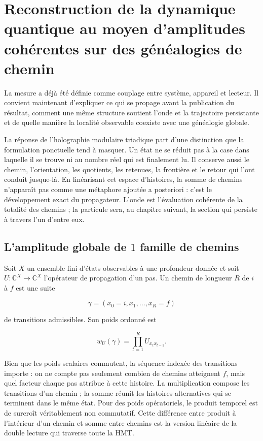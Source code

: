 \chapter{Reconstruction de la dynamique quantique au moyen d'amplitudes cohérentes sur des généalogies de chemin}


La mesure a déjà été définie comme couplage entre système, appareil et lecteur.
Il convient maintenant d'expliquer ce qui se propage avant la publication du résultat,
comment une même structure soutient l'onde et la trajectoire persistante et de quelle manière la
localité observable coexiste avec une généalogie globale.

La réponse de l'holographie modulaire triadique part d'une distinction que la
formulation ponctuelle tend à masquer. Un état ne se réduit pas à la case dans
laquelle il se trouve ni au nombre réel qui est finalement lu. Il conserve aussi
le chemin, l'orientation, les quotients, les retenues, la frontière et le retour qui
l'ont conduit jusque-là. En linéarisant cet espace d'histoires, la somme de chemins
n'apparaît pas comme une métaphore ajoutée a posteriori : c'est le développement exact du
propagateur. L'onde est l'évaluation cohérente de la totalité des chemins ; la
particule sera, au chapitre suivant, la section qui persiste à travers l'un
d'entre eux.

\section{L'amplitude globale de \(1\) famille de chemins}

Soit \(X\) un ensemble fini d'états observables à une profondeur donnée et soit
\(U:\mathbb C^X\to\mathbb C^X\) l'opérateur de propagation d'un pas. Un chemin de
longueur \(R\) de \(i\) à \(f\) est une suite

\[
  \gamma=(x_0=i,x_1,\ldots,x_R=f)
\]

de transitions admissibles. Son poids ordonné est

\[
  w_U(\gamma)=\prod_{t=1}^{R}U_{x_t x_{t-1}}.
\]

Bien que les poids scalaires commutent, la séquence indexée des transitions importe :
on ne compte pas seulement combien de chemins atteignent \(f\), mais quel facteur
chaque pas attribue à cette histoire. La multiplication compose les transitions d'un chemin ; la
somme réunit les histoires alternatives qui se terminent dans le même état. Pour des poids
opératoriels, le produit temporel est de surcroît véritablement non commutatif. Cette
différence entre produit à l'intérieur d'un chemin et somme entre chemins est la version linéaire
de la double lecture qui traverse toute la HMT.

